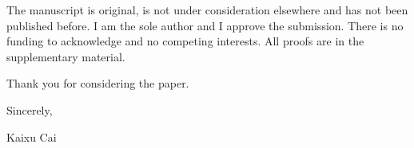 \documentclass[11pt]{article}
\begin{document}
The manuscript is original, is not under consideration elsewhere and has not been published
before. I am the sole author and I approve the submission. There is no funding to acknowledge
and no competing interests. All proofs are in the supplementary material.

Thank you for considering the paper.

\medskip
Sincerely,

\medskip
Kaixu Cai
\end{document}
